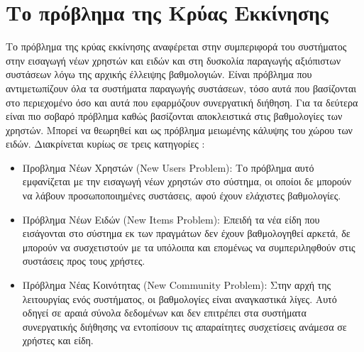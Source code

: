 \section{Το πρόβλημα της Κρύας Εκκίνησης} 
Το πρόβλημα της κρύας εκκίνησης αναφέρεται στην συμπεριφορά του συστήματος στην εισαγωγή νέων χρηστών και ειδών και στη δυσκολία παραγωγής αξιόπιστων συστάσεων λόγω της αρχικής έλλειψης βαθμολογιών. Είναι πρόβλημα που αντιμετωπίζουν όλα τα συστήματα παραγωγής συστάσεων, τόσο αυτά που βασίζονται στο περιεχομένο όσο και αυτά που εφαρμόζουν συνεργατική διήθηση. Για τα δεύτερα είναι πιο σοβαρό πρόβλημα καθώς βασίζονται αποκλειστικά στις βαθμολογίες των χρηστών. Μπορεί να θεωρηθεί και ως πρόβλημα μειωμένης κάλυψης του χώρου των ειδών.\cite{ricci2011recommender} Διακρίνεται κυρίως σε τρεις κατηγορίες \cite{Nikolakopoulos2015126}: 
\begin{itemize}
\item Προβλημα Νέων Χρηστών ({\en New Users Problem}): Το πρόβλημα αυτό εμφανίζεται με την εισαγωγή νέων χρηστών στο σύστημα, οι οποίοι δε μπορούν να λάβουν προσωποποιημένες συστάσεις, αφού έχουν ελάχιστες βαθμολογίες.
\item Πρόβλημα Νέων Ειδών ({\en New Items Problem}): Επειδή τα νέα είδη που εισάγονται στο σύστημα εκ των πραγμάτων δεν έχουν βαθμολογηθεί αρκετά, δε μπορούν να συσχετιστούν με τα υπόλοιπα και επομένως να συμπεριληφθούν στις συστάσεις προς τους χρήστες. 
\item Πρόβλημα Νέας Κοινότητας ({\en New Community Problem}): Στην αρχή της λειτουργίας ενός συστήματος, οι βαθμολογίες είναι αναγκαστικά λίγες. Αυτό οδηγεί σε αραιά σύνολα δεδομένων και δεν επιτρέπει στα συστήματα συνεργατικής διήθησης να εντοπίσουν τις απαραίτητες συσχετίσεις ανάμεσα σε χρήστες και είδη.
\end{itemize}\par
